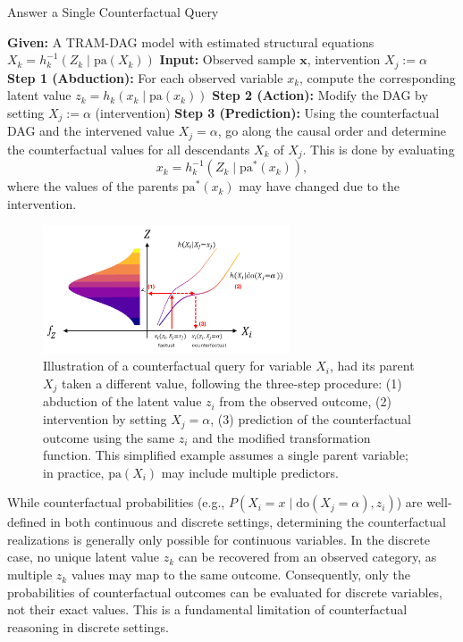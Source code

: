 \begin{algorithm}
\caption{Answer a Single Counterfactual Query}
\label{alg:single_cf}
\begin{algorithmic}
\State \textbf{Given:} A TRAM-DAG model with estimated structural equations $X_k = h_k^{-1}(Z_k \mid \text{pa}(X_k))$
\State \textbf{Input:} Observed sample $\mathbf{x}$, intervention $X_j := \alpha$
\vspace{0.3em}
\State \textbf{Step 1 (Abduction):} For each observed variable $x_k$, compute the corresponding latent value $z_k = h_k(x_k \mid \text{pa}(x_k))$
\vspace{0.3em}
\State \textbf{Step 2 (Action):} Modify the DAG by setting $X_j := \alpha$ (intervention)
\vspace{0.3em}
\State \textbf{Step 3 (Prediction):} Using the counterfactual DAG and the intervened value $X_j = \alpha$, go along the causal order and determine the counterfactual values for all descendants $X_k$ of $X_j$. This is done by evaluating
\[
x_k = h_k^{-1}(Z_k \mid \text{pa}^*(x_k)),
\]
where the values of the parents $\text{pa}^*(x_k)$ may have changed due to the intervention.
\end{algorithmic}
\end{algorithm}

\begin{figure}[H]
\centering
\includegraphics[width=0.65\textwidth]{img/counterfactuals.png}
\caption{Illustration of a counterfactual query for variable $X_i$, had its parent $X_j$ taken a different value, following the three-step procedure: (1) abduction of the latent value $z_i$ from the observed outcome, (2) intervention by setting $X_j = \alpha$, (3) prediction of the counterfactual outcome using the same $z_i$ and the modified transformation function. This simplified example assumes a single parent variable; in practice, $\text{pa}(X_i)$ may include multiple predictors.}
\label{fig:cf_viz}
\end{figure}



While counterfactual probabilities (e.g., $P(X_i = x \mid \text{do}(X_j = \alpha), z_i)$) are well-defined in both continuous and discrete settings, determining the counterfactual realizations is generally only possible for continuous variables. In the discrete case, no unique latent value $z_k$ can be recovered from an observed category, as multiple $z_k$ values may map to the same outcome. Consequently, only the probabilities of counterfactual outcomes can be evaluated for discrete variables, not their exact values. This is a fundamental limitation of counterfactual reasoning in discrete settings.

